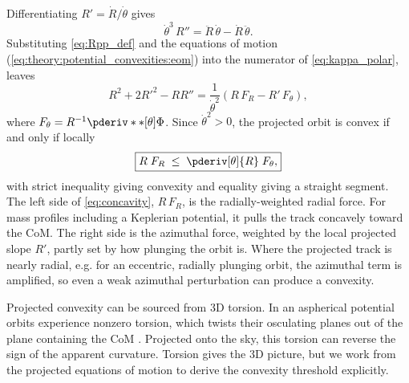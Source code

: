 \documentclass[linenumbers,twocolumn]{aastex701}
\begin{document}
    Differentiating $R' = \dot{R}/\dot{\theta}$ gives
    \begin{equation} \label{eq:Rpp_def}
      \dot{\theta}^3 \, R'' = \ddot{R}\,\dot{\theta} - \dot{R}\,\ddot{\theta}. %
    \end{equation}
    Substituting \cref{eq:Rpp_def} and the equations of motion (\cref{eq:theory:potential_convexities:eom}) into the numerator of \cref{eq:kappa_polar}, leaves
    \begin{equation} \label{eq:numerator}
      R^2 + 2R'^2 - RR''
        = \frac{1}{\dot{\theta}^2}
          \left(R\,F_R - R'\,F_\theta \right),
    \end{equation}
    where $F_\theta = R^{-1} \pderiv**[\theta]{\Phi}$. %
    Since $\dot{\theta}^2 > 0$, the projected orbit is convex if and only if locally %
    \begin{equation} \label{eq:concavity}
        \boxed{
            R\;F_R \; \leq \; \pderiv[\theta]{R} \;F_\theta,
        }
    \end{equation}
    with strict inequality giving convexity and equality giving a straight segment. %
    The left side of \cref{eq:concavity}, $R\, F_R$, is the radially-weighted radial force. %
    For mass profiles including a Keplerian potential, it pulls the track concavely toward the \gls{CoM}. %
    The right side is the azimuthal force, weighted by the local projected slope $R'$, partly set by how plunging the orbit is. %
    Where the projected track is nearly radial, e.g. for an eccentric, radially plunging orbit, the azimuthal term is amplified, so even a weak azimuthal perturbation can produce a convexity. %

    Projected convexity can be sourced from 3D torsion. %
    In an aspherical potential orbits experience nonzero torsion, which twists their osculating planes out of the plane containing the \gls{CoM} \citep{Bariego-Quintana:2024:TorsionStellarStreams}. %
    Projected onto the sky, this torsion can reverse the sign of the apparent curvature. %
    Torsion gives the 3D picture, but we work from the projected equations of motion to derive the convexity threshold explicitly. %
\end{document}
